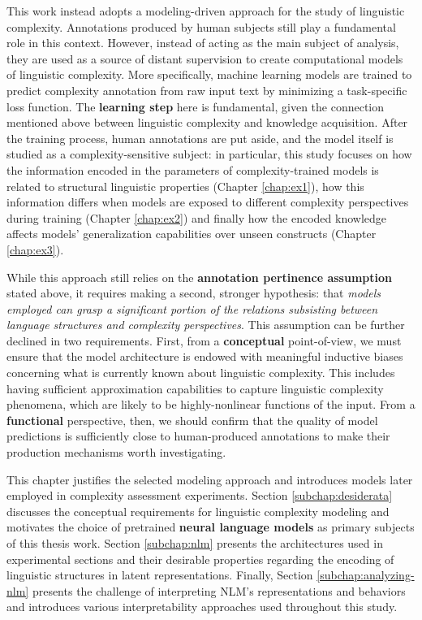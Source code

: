 \documentclass[a4paper, nobind]{templates/ociamthesis}
\begin{document}
This work instead adopts a modeling-driven approach for the study of linguistic complexity. Annotations produced by human subjects still play a fundamental role in this context. However, instead of acting as the main subject of analysis, they are used as a source of distant supervision to create computational models of linguistic complexity. More specifically, machine learning models are trained to predict complexity annotation from raw input text by minimizing a task-specific loss function. The \textbf{learning step} here is fundamental, given the connection mentioned above between linguistic complexity and knowledge acquisition. After the training process, human annotations are put aside, and the model itself is studied as a complexity-sensitive subject: in particular, this study focuses on how the information encoded in the parameters of complexity-trained models is related to structural linguistic properties (Chapter \ref{chap:ex1}), how this information differs when models are exposed to different complexity perspectives during training (Chapter \ref{chap:ex2}) and finally how the encoded knowledge affects models' generalization capabilities over unseen constructs (Chapter \ref{chap:ex3}).

While this approach still relies on the \textbf{annotation pertinence assumption} stated above, it requires making a second, stronger hypothesis: that \emph{models employed can grasp a significant portion of the relations subsisting between language structures and complexity perspectives}. This assumption can be further declined in two requirements. First, from a \textbf{conceptual} point-of-view, we must ensure that the model architecture is endowed with meaningful inductive biases concerning what is currently known about linguistic complexity. This includes having sufficient approximation capabilities to capture linguistic complexity phenomena, which are likely to be highly-nonlinear functions of the input. From a \textbf{functional} perspective, then, we should confirm that the quality of model predictions is sufficiently close to human-produced annotations to make their production mechanisms worth investigating.

This chapter justifies the selected modeling approach and introduces models later employed in complexity assessment experiments. Section \ref{subchap:desiderata} discusses the conceptual requirements for linguistic complexity modeling and motivates the choice of pretrained \textbf{neural language models} as primary subjects of this thesis work. Section \ref{subchap:nlm} presents the architectures used in experimental sections and their desirable properties regarding the encoding of linguistic structures in latent representations. Finally, Section \ref{subchap:analyzing-nlm} presents the challenge of interpreting NLM's representations and behaviors and introduces various interpretability approaches used throughout this study.
\end{document}
